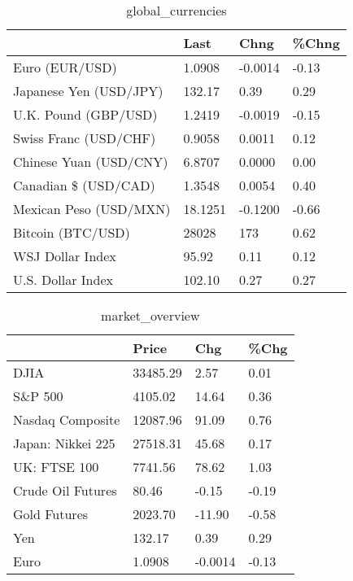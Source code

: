 \documentclass{article}%
\begin{document}
%


\begin{table}[htbp]%
\caption{global\_currencies}%
\centering%
\begin{adjustbox}{width=1\textwidth}%
\begin{tabular}{llll}
\toprule
                       &    Last &    Chng & \%Chng \\
\midrule
        Euro (EUR/USD) &  1.0908 & -0.0014 & -0.13 \\
Japanese Yen (USD/JPY) &  132.17 &    0.39 &  0.29 \\
  U.K. Pound (GBP/USD) &  1.2419 & -0.0019 & -0.15 \\
 Swiss Franc (USD/CHF) &  0.9058 &  0.0011 &  0.12 \\
Chinese Yuan (USD/CNY) &  6.8707 &  0.0000 &  0.00 \\
  Canadian \$ (USD/CAD) &  1.3548 &  0.0054 &  0.40 \\
Mexican Peso (USD/MXN) & 18.1251 & -0.1200 & -0.66 \\
     Bitcoin (BTC/USD) &   28028 &     173 &  0.62 \\
      WSJ Dollar Index &   95.92 &    0.11 &  0.12 \\
     U.S. Dollar Index &  102.10 &    0.27 &  0.27 \\
\bottomrule
\end{tabular}
%
\end{adjustbox}%
\end{table}

%


\begin{table}[htbp]%
\caption{market\_overview}%
\centering%
\begin{adjustbox}{width=1\textwidth}%
\begin{tabular}{llll}
\toprule
                  &    Price &     Chg &  \%Chg \\
\midrule
             DJIA & 33485.29 &    2.57 &  0.01 \\
          S\&P 500 &  4105.02 &   14.64 &  0.36 \\
 Nasdaq Composite & 12087.96 &   91.09 &  0.76 \\
Japan: Nikkei 225 & 27518.31 &   45.68 &  0.17 \\
     UK: FTSE 100 &  7741.56 &   78.62 &  1.03 \\
Crude Oil Futures &    80.46 &   -0.15 & -0.19 \\
     Gold Futures &  2023.70 &  -11.90 & -0.58 \\
              Yen &   132.17 &    0.39 &  0.29 \\
             Euro &   1.0908 & -0.0014 & -0.13 \\
\bottomrule
\end{tabular}
%
\end{adjustbox}%
\end{table}

%
\end{document}
